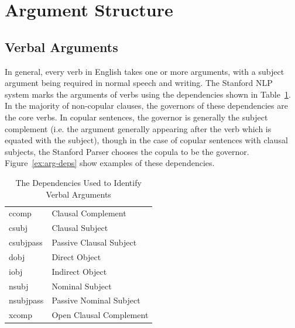 \documentclass[main.tex]{subfiles}
\begin{document}
\section{Argument Structure}
\setcounter{section}{6}

\subsection{Verbal Arguments}

In general, every verb in English takes one or more arguments, with a subject argument being required in normal speech and writing. The Stanford NLP system marks the arguments of verbs using the dependencies shown in Table~\ref{table:arg-deps}. In the majority of non-copular clauses, the governors of these dependencies are the core verbs. In copular sentences, the governor is generally the subject complement (i.e. the argument generally appearing after the verb which is equated with the subject), though in the case of copular sentences with clausal subjects, the Stanford Parser chooses the copula to be the governor.
Figure~\ref{ex:arg-deps} show examples of these dependencies.

\begin{table}[ht]
\small
\centering
\caption{The Dependencies Used to Identify Verbal Arguments}
\begin{tabular}{ l l }
\toprule
ccomp & Clausal Complement\\
csubj & Clausal Subject\\
csubjpass & Passive Clausal Subject\\
dobj & Direct Object\\
iobj & Indirect Object \\
nsubj & Nominal Subject\\
nsubjpass & Passive Nominal Subject\\
xcomp & Open Clausal Complement\\

\bottomrule
\end{tabular}
\label{table:arg-deps}
\end{table}
\end{document}
